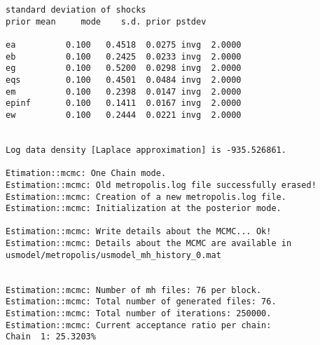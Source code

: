 \documentclass[]{article}
\begin{document}
\begin{verbatim}
standard deviation of shocks
prior mean     mode    s.d. prior pstdev

ea          0.100   0.4518  0.0275 invg  2.0000 
eb          0.100   0.2425  0.0233 invg  2.0000 
eg          0.100   0.5200  0.0298 invg  2.0000 
eqs         0.100   0.4501  0.0484 invg  2.0000 
em          0.100   0.2398  0.0147 invg  2.0000 
epinf       0.100   0.1411  0.0167 invg  2.0000 
ew          0.100   0.2444  0.0221 invg  2.0000 


Log data density [Laplace approximation] is -935.526861.

Etimation::mcmc: One Chain mode.
Estimation::mcmc: Old metropolis.log file successfully erased!
Estimation::mcmc: Creation of a new metropolis.log file.
Estimation::mcmc: Initialization at the posterior mode.

Estimation::mcmc: Write details about the MCMC... Ok!
Estimation::mcmc: Details about the MCMC are available in usmodel/metropolis/usmodel_mh_history_0.mat


Estimation::mcmc: Number of mh files: 76 per block.
Estimation::mcmc: Total number of generated files: 76.
Estimation::mcmc: Total number of iterations: 250000.
Estimation::mcmc: Current acceptance ratio per chain: 
Chain  1: 25.3203%


\end{verbatim}
\end{document}
